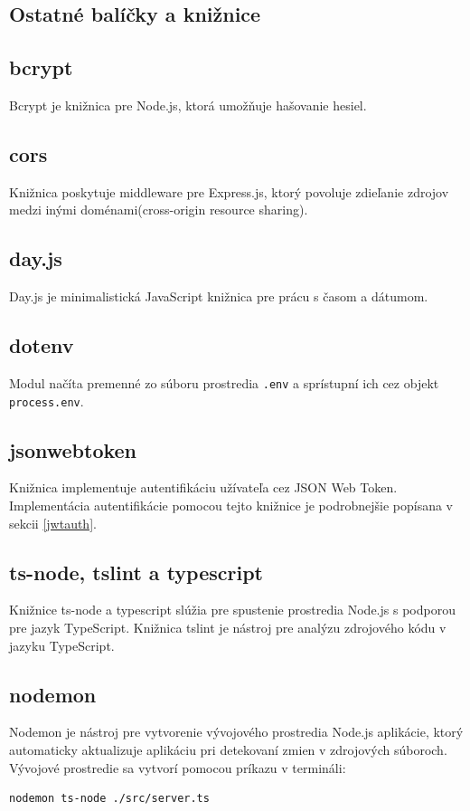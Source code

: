 \subsection{Ostatné balíčky a knižnice}
\subsection*{bcrypt}
Bcrypt je knižnica pre Node.js, ktorá umožňuje hašovanie hesiel.

\subsection*{cors}
Knižnica poskytuje middleware pre Express.js, ktorý povoluje zdieľanie zdrojov medzi inými doménami(cross-origin resource sharing).

\subsection*{day.js}
Day.js je minimalistická JavaScript knižnica pre prácu s časom a dátumom.

\subsection*{dotenv}
Modul načíta premenné zo súboru prostredia \texttt{.env} a sprístupní ich cez objekt \texttt{process.env}.

\subsection*{jsonwebtoken}
Knižnica implementuje autentifikáciu užívateľa cez JSON Web Token. Implementácia autentifikácie pomocou tejto knižnice je podrobnejšie popísana v sekcii \ref{jwtauth}.

\subsection*{ts-node, tslint a typescript}
Knižnice ts-node a typescript slúžia pre spustenie prostredia Node.js s podporou pre jazyk TypeScript. Knižnica tslint je nástroj pre analýzu zdrojového kódu v jazyku TypeScript.

\subsection*{nodemon}
Nodemon je nástroj pre vytvorenie vývojového prostredia Node.js aplikácie, ktorý automaticky aktualizuje aplikáciu pri detekovaní zmien v zdrojových súboroch. Vývojové prostredie sa vytvorí pomocou príkazu v termináli:
\begin{verbatim}nodemon ts-node ./src/server.ts
\end{verbatim}
